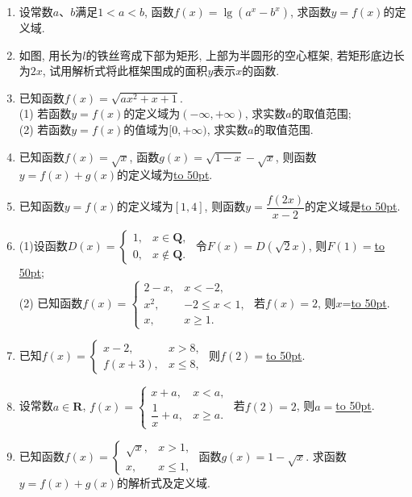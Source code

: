 \documentclass[10pt,a4paper]{article}
\newcommand{\blank}[1]{\underline{\hbox to #1pt{}}}
\begin{document}
\begin{enumerate}[1.]
\item 设常数$a$、$b$满足$1<a<b$, 函数$f(x)=\lg(a^x-b^x)$, 求函数$y=f(x)$的定义域.
\item 如图, 用长为$l$的铁丝弯成下部为矩形, 上部为半圆形的空心框架, 若矩形底边长为$2x$, 试用解析式将此框架围成的面积$y$表示$x$的函数.
\begin{center}
\end{center}
\item 已知函数$f(x)=\sqrt{ax^2+x+1}$.\\
(1) 若函数$y=f(x)$的定义域为$(-\infty ,+\infty)$, 求实数$a$的取值范围;\\
(2) 若函数$y=f(x)$的值域为$[0,+\infty)$, 求实数$a$的取值范围.
\item 已知函数$f(x)=\sqrt x$, 函数$g(x)=\sqrt{1-x}-\sqrt x$, 则函数$y=f(x)+g(x)$的定义域为\blank{50}.
\item 已知函数$y=f(x)$的定义域为$[1,4]$, 则函数$y=\dfrac{f(2x)}{x-2}$的定义域是\blank{50}.
\item (1)设函数$D(x)=\begin{cases} 1, & x\in \mathbf{Q}, \\  0, &x\notin\mathbf{Q}. \end{cases}$ 令$F(x)=D(\sqrt 2x)$, 则$F(1)=$\blank{50};\\
(2) 已知函数$f(x)=\begin{cases} 2-x, & x<-2, \\ x^2, & -2\le x<1, \\ x, & x\ge 1. \end{cases}$ 若$f(x)=2$, 则$x$=\blank{50}.
\item 已知$f(x)=\begin{cases} x-2, & x>8, \\ f(x+3), & x\le 8, \end{cases}$ 则$f(2)=$\blank{50}.
\item 设常数$a\in \mathbf{R}$, $f(x)=\begin{cases}x+a, &x<a, \\ \dfrac 1x+a, & x\ge a. \end{cases}$ 若$f(2)=2$, 则$a=$\blank{50}.
\item 已知函数$f(x)=\begin{cases} \sqrt x, & x>1, \\ x, &x\le 1,  \end{cases}$ 函数$g(x)=1-\sqrt x$. 求函数$y=f(x)+g(x)$的解析式及定义域.

\end{enumerate}
\end{document}
